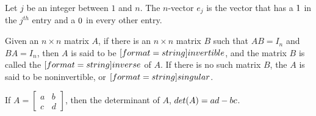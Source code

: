\documentclass{ximera}
\begin{document}
\begin{question}
Let $j$ be an integer between $1$ and $n$. The $n$-vector $e_j$ is the vector that has a ${1}$ in the $j^{th}$ entry and a ${0}$ in every other entry. 
\end{question} 

\begin{question}
Given an $n \times n$ matrix $A$, if there is an $n \times n$ matrix $B$ such that 
$AB=I_n$ and $BA=I_n$, then $A$ is said to be $[format=string]{invertible}$, and the matrix $B$ is called the $[format=string]{inverse}$ of $A$. If there is no such matrix $B$, the $A$ is said to be noninvertible, or $[format=string]{singular}$. 
\end{question} 

\begin{question}
If $A = \begin{bmatrix} a & b \\ c & d\end{bmatrix}$, then the determinant of $A$, $det(A) = {ad - bc}$. 
\end{question} 

%
%
%
%
%
\end{document}
